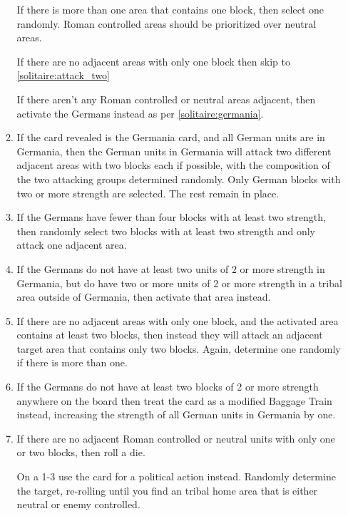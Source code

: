 \begin{enumerate}
\begin{enumerate}[leftmargin=0in]
    If there is more than one area that contains one block, then select one randomly. Roman controlled areas should be prioritized over neutral areas.
    
    If there are no adjacent areas with only one block then skip to \ref{solitaire:attack_two}
    
    If there aren't any Roman controlled or neutral areas adjacent, then activate the Germans instead as per \ref{solitaire:germania}.

    \item \label{solitaire:germania}If the card revealed is the Germania card, and all German units are in Germania, then the German units in Germania will attack two different adjacent areas with two blocks each if possible, with the composition of the two attacking groups determined randomly. Only German blocks with two or more strength are selected. The rest remain in place.

    \item If the Germans have fewer than four blocks with at least two strength, then randomly select two blocks with at least two strength and only attack one adjacent area.
    
    \item If the Germans do not have at least two units of 2 or more strength in Germania, but do have two or more units of 2 or more strength in a tribal area outside of Germania, then activate that area instead.

    \item \label{solitaire:attack_two}If there are no adjacent areas with only one block, and the activated area contains at least two blocks, then instead they will attack an adjacent target area that contains only two blocks. Again, determine one randomly if there is more than one.
    
    \item If the Germans do not have at least two blocks of 2 or more strength anywhere on the board then treat the card as a modified Baggage Train instead, increasing the strength of all German units in Germania by one.

    \item If there are no adjacent Roman controlled or neutral units with only one or two blocks, then roll a die.
    
    On a 1-3 use the card for a political action instead. Randomly determine the target, re-rolling until you find an tribal home area that is either neutral or enemy controlled.
    

\end{enumerate}
\end{enumerate}
